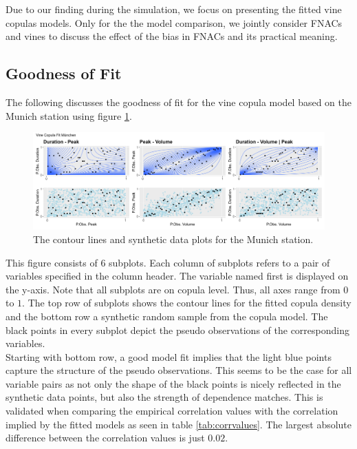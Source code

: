 \documentclass[
]{krantz}
\begin{document}
Due to our finding during the simulation, we focus on presenting the fitted vine copulas models.
Only for the the model comparison, we jointly consider FNACs and vines to discuss the
effect of the bias in FNACs and its practical meaning.

\subsection{Goodness of Fit}\label{goodness-of-fit}

The following discusses the goodness of fit for the vine copula model
based on the Munich station using figure \ref{fig:visualGoF}.

\begin{figure}

{\centering \includegraphics[width=1\linewidth]{work/04-floodfreq/figures/app_visualGOF} 

}

\caption{The contour lines and synthetic data plots for the Munich station.}\label{fig:visualGoF}
\end{figure}

This figure consists of \(6\) subplots.
Each column of subplots refers to a pair of variables specified in the column header.
The variable named first is displayed on the y-axis.
Note that all subplots are on copula level. Thus, all axes range from \(0\) to \(1\).
The top row of subplots shows the contour lines for the fitted copula density and the bottom row a synthetic
random sample from the copula model.
The black points in every subplot depict the pseudo observations of the corresponding variables.\\
Starting with bottom row, a good model fit implies that the light blue points capture the structure
of the pseudo observations.
This seems to be the case for all variable pairs as not only the shape of the black points is nicely
reflected in the synthetic data points, but also the strength of dependence matches.
This is validated when comparing the empirical correlation values with the correlation implied
by the fitted models as seen in table \ref{tab:corrvalues}.
The largest absolute difference between the correlation values is just \(0.02\).
\end{document}
